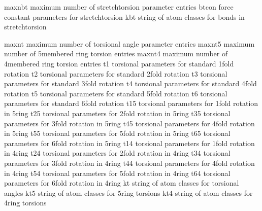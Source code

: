 \documentclass[letterpaper,11pt,english]{sphinxmanual}
\begin{document}

\begin{sphinxVerbatim}[commandchars=\\\{\}]
maxnbt          maximum number of stretch\PYGZhy{}torsion parameter entries
btcon           force constant parameters for stretch\PYGZhy{}torsion
kbt             string of atom classes for bonds in stretch\PYGZhy{}torsion
\end{sphinxVerbatim}


\begin{sphinxVerbatim}[commandchars=\\\{\}]
maxnt           maximum number of torsional angle parameter entries
maxnt5          maximum number of 5\PYGZhy{}membered ring torsion entries
maxnt4          maximum number of 4\PYGZhy{}membered ring torsion entries
t1              torsional parameters for standard 1\PYGZhy{}fold rotation
t2              torsional parameters for standard 2\PYGZhy{}fold rotation
t3              torsional parameters for standard 3\PYGZhy{}fold rotation
t4              torsional parameters for standard 4\PYGZhy{}fold rotation
t5              torsional parameters for standard 5\PYGZhy{}fold rotation
t6              torsional parameters for standard 6\PYGZhy{}fold rotation
t15             torsional parameters for 1\PYGZhy{}fold rotation in 5\PYGZhy{}ring
t25             torsional parameters for 2\PYGZhy{}fold rotation in 5\PYGZhy{}ring
t35             torsional parameters for 3\PYGZhy{}fold rotation in 5\PYGZhy{}ring
t45             torsional parameters for 4\PYGZhy{}fold rotation in 5\PYGZhy{}ring
t55             torsional parameters for 5\PYGZhy{}fold rotation in 5\PYGZhy{}ring
t65             torsional parameters for 6\PYGZhy{}fold rotation in 5\PYGZhy{}ring
t14             torsional parameters for 1\PYGZhy{}fold rotation in 4\PYGZhy{}ring
t24             torsional parameters for 2\PYGZhy{}fold rotation in 4\PYGZhy{}ring
t34             torsional parameters for 3\PYGZhy{}fold rotation in 4\PYGZhy{}ring
t44             torsional parameters for 4\PYGZhy{}fold rotation in 4\PYGZhy{}ring
t54             torsional parameters for 5\PYGZhy{}fold rotation in 4\PYGZhy{}ring
t64             torsional parameters for 6\PYGZhy{}fold rotation in 4\PYGZhy{}ring
kt              string of atom classes for torsional angles
kt5             string of atom classes for 5\PYGZhy{}ring torsions
kt4             string of atom classes for 4\PYGZhy{}ring torsions
\end{sphinxVerbatim}
\end{document}
